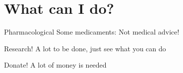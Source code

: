 \section{What can I do?}



\begin{frame}[c]{Pharmacological}
    Some medicaments: Not medical advice!
\end{frame}


\begin{frame}[c]{Research!}
    A lot to be done, just see what you can do
\end{frame}


\begin{frame}[c]{Donate!}
    A lot of money is needed
\end{frame}
